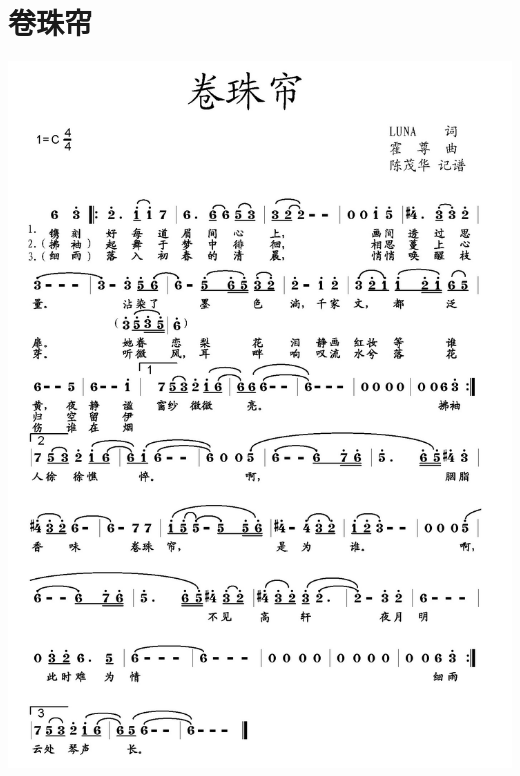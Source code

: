 \documentclass[cn,pad,chinese,chinesefont=nofont]{elegantbook}
\begin{document}
\section{卷珠帘}
    \includegraphics[width=\textwidth]{dongxiao/20200323卷珠帘.jpg}
\end{document}
